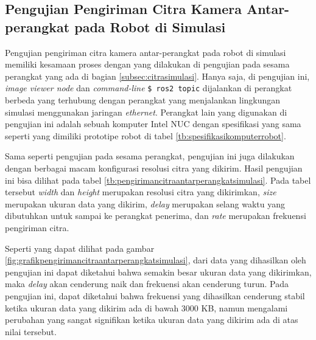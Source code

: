 \subsection{Pengujian Pengiriman Citra Kamera Antar-perangkat pada Robot di Simulasi}
\label{subsec:citraantarperangkatsimulasi}

Pengujian pengiriman citra kamera antar-perangkat pada robot di simulasi memiliki kesamaan proses dengan yang dilakukan di pengujian pada sesama perangkat yang ada di bagian \ref{subsec:citrasimulasi}.
Hanya saja, di pengujian ini, \emph{image viewer node} dan \emph{command-line} \lstinline{$ ros2 topic} dijalankan di perangkat berbeda yang terhubung dengan perangkat yang menjalankan lingkungan simulasi menggunakan jaringan \emph{ethernet}.
Perangkat lain yang digunakan di pengujian ini adalah sebuah komputer Intel NUC dengan spesifikasi yang sama seperti yang dimiliki prototipe robot di tabel \ref{tb:spesifikasikomputerrobot}.





Sama seperti pengujian pada sesama perangkat,
  pengujian ini juga dilakukan dengan berbagai macam konfigurasi resolusi citra yang dikirim.
Hasil pengujian ini bisa dilihat pada tabel \ref{tb:pengirimancitraantarperangkatsimulasi}.
Pada tabel tersebut \emph{width} dan \emph{height} merupakan resolusi citra yang dikirimkan,
  \emph{size} merupakan ukuran data yang dikirim,
  \emph{delay} merupakan selang waktu yang dibutuhkan untuk sampai ke perangkat penerima,
  dan \emph{rate} merupakan frekuensi pengiriman citra.

Seperti yang dapat dilihat pada gambar \ref{fig:grafikpengirimancitraantarperangkatsimulasi},
  dari data yang dihasilkan oleh pengujian ini dapat diketahui bahwa semakin besar ukuran data yang dikirimkan,
  maka \emph{delay} akan cenderung naik dan frekuensi akan cenderung turun.
Pada pengujian ini, dapat diketahui bahwa frekuensi yang dihasilkan cenderung stabil ketika ukuran data yang dikirim ada di bawah 3000 KB,
  namun mengalami perubahan yang sangat signifikan ketika ukuran data yang dikirim ada di atas nilai tersebut.
